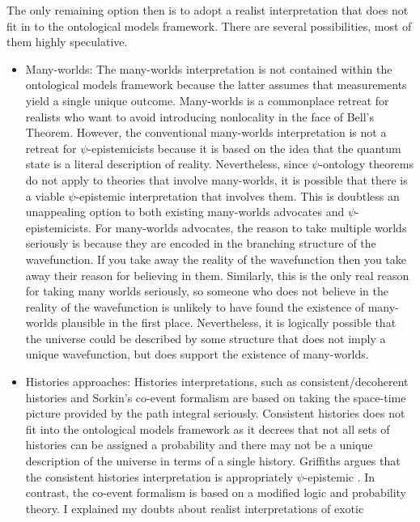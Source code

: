 \documentclass[DIV=calc,fontsize=12pt]{scrartcl} %
\theoremstyle{definition}
\theoremstyle{plain}
\begin{document}
The only remaining option then is to adopt a realist interpretation
that does not fit in to the ontological models framework.  There are
several possibilities, most of them highly speculative.

\begin{itemize}
\item Many-worlds: The many-worlds interpretation \cite{Everett1957,
DeWitt1973, Wallace2012} is not contained within the ontological
models framework because the latter assumes that measurements yield
a single unique outcome.  Many-worlds is a commonplace retreat for
realists who want to avoid introducing nonlocality in the face of
Bell's Theorem.  However, the conventional many-worlds
interpretation is not a retreat for $\psi$-epistemicists because it
is based on the idea that the quantum state is a literal description
of reality.  Nevertheless, since $\psi$-ontology theorems do not
apply to theories that involve many-worlds, it is possible that
there is a viable $\psi$-epistemic interpretation that involves
them.  This is doubtless an unappealing option to both existing
many-worlds advocates and $\psi$-epistemicists.  For many-worlds
advocates, the reason to take multiple worlds seriously is because
they are encoded in the branching structure of the wavefunction.  If
you take away the reality of the wavefunction then you take away
their reason for believing in them.  Similarly, this is the only
real reason for taking many worlds seriously, so someone who does
not believe in the reality of the wavefunction is unlikely to have
found the existence of many-worlds plausible in the first place.
Nevertheless, it is logically possible that the universe could be
described by some structure that does not imply a unique
wavefunction, but does support the existence of many-worlds.
\item Histories approaches: Histories interpretations, such as
consistent/decoherent histories \cite{Griffiths2002} and Sorkin's
co-event formalism \cite{Sorkin2007a, Sorkin2007} are based on
taking the space-time picture provided by the path integral
seriously.  Consistent histories does not fit into the ontological
models framework as it decrees that not all sets of histories can be
assigned a probability and there may not be a unique description of
the universe in terms of a single history.  Griffiths argues that
the consistent histories interpretation is appropriately
$\psi$-epistemic \cite{Griffiths2013}.  In contrast, the co-event
formalism is based on a modified logic and probability theory.  I
explained my doubts about realist interpretations of exotic

\end{itemize}
\end{document}
